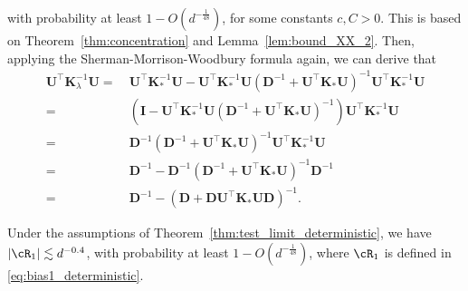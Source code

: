 \documentclass[twoside,11pt]{article}
\def\bI{{\mathbf I}}
\def\bD{{\boldsymbol D}}
\def\bK{{\boldsymbol K}}
\def\bU{{\boldsymbol U}}
\renewcommand{\bK}{\boldsymbol{K}}
\newcommand{\1}{\mathbf{1}}
\begin{document}
with probability at least $1-O(d^{-\frac{1}{48}})$, for some constants $c,C>0$. This is based on Theorem~\ref{thm:concentration} and Lemma~\ref{lem:bound_XX_2}. Then, applying the Sherman-Morrison-Woodbury formula again, we can derive that
\begin{align}
    \bU^\top\bK_{\lambda }^{-1}\bU  =  ~& \bU^\top\bK_*^{-1}\bU-  \bU^\top\bK_*^{-1}\bU(\bD^{-1}+\bU^\top\bK_*\bU)^{-1}\bU^\top\bK_*^{-1}\bU \\
    =~&(\bI-  \bU^\top\bK_*^{-1}\bU(\bD^{-1}+\bU^\top\bK_*\bU)^{-1})\bU^\top\bK_*^{-1}\bU \\
    =~& \bD^{-1}(\bD^{-1}+\bU^\top\bK_*\bU)^{-1}\bU^\top\bK_*^{-1}\bU\\
  =  ~& \bD^{-1}-\bD^{-1}(\bD^{-1}+\bU^\top\bK_*\bU)^{-1}\bD^{-1}\\
    =~& \bD^{-1}-(\bD+\bD\bU^\top\bK_*\bU\bD)^{-1}.\label{eq:UKU_decomp}
\end{align}
\begin{lemma}\label{lemm:bias1_deterministic}
    Under the assumptions of Theorem~\ref{thm:test_limit_deterministic}, we have
    $|\cR_1|\lesssim d^{-0.4}$,
    with probability at least $1-O(d^{-\frac{1}{48}})$,
    where $\cR_1$ is defined in \eqref{eq:bias1_deterministic}.
\end{lemma}
\end{document}
